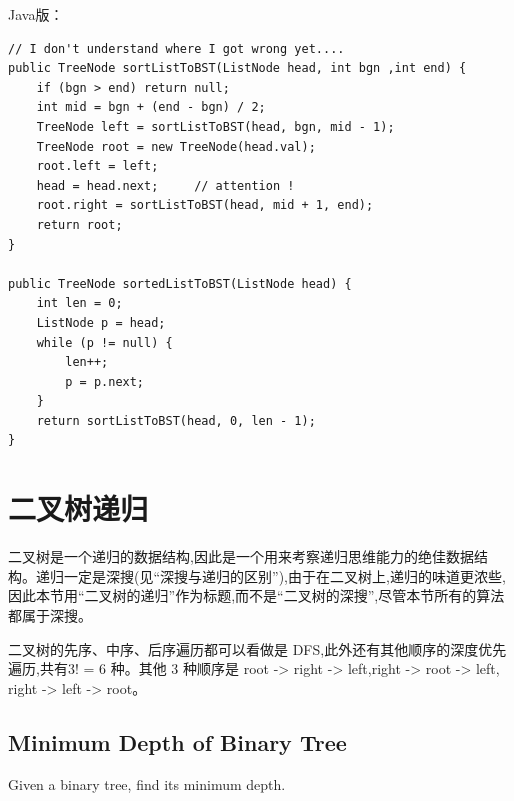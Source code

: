 \documentclass[12pt]{book}
\begin{document}
\begin{enumerate}
Java版：

\lstset{language=java,label= ,caption= ,numbers=none}
\begin{lstlisting}
// I don't understand where I got wrong yet....
public TreeNode sortListToBST(ListNode head, int bgn ,int end) {
    if (bgn > end) return null;
    int mid = bgn + (end - bgn) / 2;
    TreeNode left = sortListToBST(head, bgn, mid - 1);
    TreeNode root = new TreeNode(head.val);
    root.left = left;
    head = head.next;     // attention !
    root.right = sortListToBST(head, mid + 1, end);
    return root;
}

public TreeNode sortedListToBST(ListNode head) {
    int len = 0;
    ListNode p = head;
    while (p != null) {
        len++;
        p = p.next;
    }
    return sortListToBST(head, 0, len - 1);
}
\end{lstlisting}
\end{enumerate}

\section{二叉树递归}
\label{sec-4-5}
二叉树是一个递归的数据结构,因此是一个用来考察递归思维能力的绝佳数据结构。递归一定是深搜(见“深搜与递归的区别”),由于在二叉树上,递归的味道更浓些,因此本节用“二叉树的递归”作为标题,而不是“二叉树的深搜”,尽管本节所有的算法都属于深搜。

二叉树的先序、中序、后序遍历都可以看做是 DFS,此外还有其他顺序的深度优先遍历,共有3! = 6 种。其他 3 种顺序是 root -> right -> left,right -> root -> left, right -> left -> root。
\subsection{Minimum Depth of Binary Tree}
\label{sec-4-5-1}
Given a binary tree, find its minimum depth.
\end{document}
